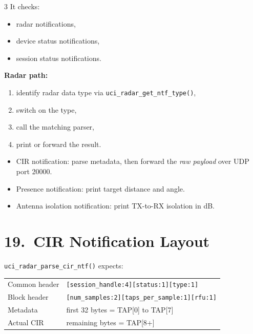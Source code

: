 \documentclass[10pt]{article}
\begin{document}
\begin{multicols*}{3}
It checks:
\begin{itemize}
  \item radar notifications,
  \item device status notifications,
  \item session status notifications.
\end{itemize}

\textbf{Radar path:}
\begin{enumerate}
  \item identify radar data type via \texttt{uci\_radar\_get\_ntf\_type()},
  \item switch on the type,
  \item call the matching parser,
  \item print or forward the result.
\end{enumerate}

\begin{tcolorbox}[intubox={Current App Behavior}]
\begin{itemize}
  \item CIR notification:
  parse metadata, then forward the \emph{raw payload} over UDP port 20000.
  \item Presence notification:
  print target distance and angle.
  \item Antenna isolation notification:
  print TX-to-RX isolation in dB.
\end{itemize}
\end{tcolorbox}

\section*{19.\ CIR Notification Layout}

\texttt{uci\_radar\_parse\_cir\_ntf()} expects:

\begin{tcolorbox}[newbox={RADAR\_RX\_NTF for CIR}]
\begin{tabular}{@{}ll@{}}
Common header & \texttt{[session\_handle:4][status:1][type:1]} \\
Block header & \texttt{[num\_samples:2][taps\_per\_sample:1][rfu:1]} \\
Metadata & first 32 bytes = TAP[0] to TAP[7] \\
Actual CIR & remaining bytes = TAP[8+] \\
\end{tabular}
\end{tcolorbox}


\end{multicols*}
\end{document}
